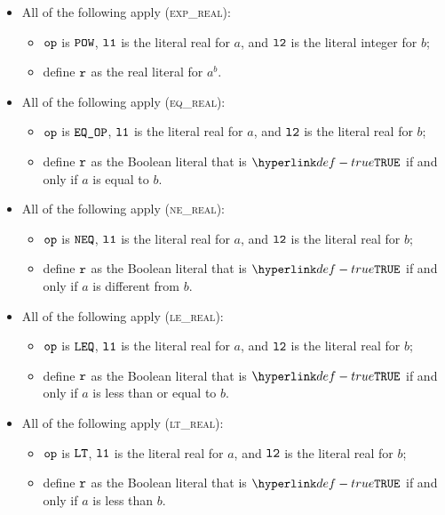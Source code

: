 \documentclass{book}
\begin{document}
\begin{itemize}
  \item All of the following apply (\textsc{exp\_real}):
  \begin{itemize}
    \item $\texttt{op}$ is $\texttt{POW}$, $\texttt{l1}$ is the literal real for $a$, and $\texttt{l2}$ is the literal integer for $b$;
    \item define $\texttt{r}$ as the real literal for $a^b$.
  \end{itemize}

  \item All of the following apply (\textsc{eq\_real}):
  \begin{itemize}
    \item $\texttt{op}$ is $\texttt{EQ\_OP}$, $\texttt{l1}$ is the literal real for $a$, and $\texttt{l2}$ is the literal real for $b$;
    \item define $\texttt{r}$ as the Boolean literal that is $\True$ if and only if $a$ is equal to $b$.
  \end{itemize}

  \item All of the following apply (\textsc{ne\_real}):
  \begin{itemize}
    \item $\texttt{op}$ is $\texttt{NEQ}$, $\texttt{l1}$ is the literal real for $a$, and $\texttt{l2}$ is the literal real for $b$;
    \item define $\texttt{r}$ as the Boolean literal that is $\True$ if and only if $a$ is different from $b$.
  \end{itemize}

  \item All of the following apply (\textsc{le\_real}):
  \begin{itemize}
    \item $\texttt{op}$ is $\texttt{LEQ}$, $\texttt{l1}$ is the literal real for $a$, and $\texttt{l2}$ is the literal real for $b$;
    \item define $\texttt{r}$ as the Boolean literal that is $\True$ if and only if $a$ is less than or equal to $b$.
  \end{itemize}

  \item All of the following apply (\textsc{lt\_real}):
  \begin{itemize}
    \item $\texttt{op}$ is $\texttt{LT}$, $\texttt{l1}$ is the literal real for $a$, and $\texttt{l2}$ is the literal real for $b$;
    \item define $\texttt{r}$ as the Boolean literal that is $\True$ if and only if $a$ is less than $b$.
  \end{itemize}


\end{itemize}
\end{document}
